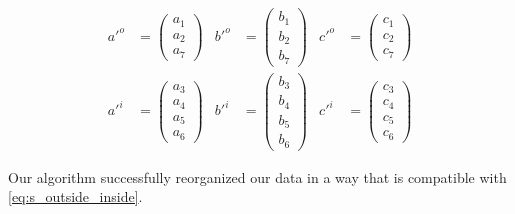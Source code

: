 \begin{equation}
    \begin{aligned}
        a'^o &= \begin{pmatrix}a_1\\a_2\\a_7\end{pmatrix}
        &
        b'^o &= \begin{pmatrix}b_1\\b_2\\b_7\end{pmatrix}
        &
        c'^o &= \begin{pmatrix}c_1\\c_2\\c_7\end{pmatrix}
        \\
        a'^i &= \begin{pmatrix}a_3\\a_4\\a_5\\a_6\end{pmatrix}
        &
        b'^i &= \begin{pmatrix}b_3\\b_4\\b_5\\b_6\end{pmatrix}
        &
        c'^i &= \begin{pmatrix}c_3\\c_4\\c_5\\c_6\end{pmatrix}
    \end{aligned}
    \label{eq:qa_qb_qc_decomposed}
\end{equation}

Our algorithm successfully reorganized our data in a way that is compatible with \cref{eq:s_outside_inside}.

